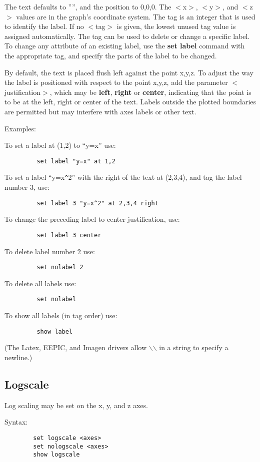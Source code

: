 The text defaults to '''', and the position to 0,0,0.  The $<$x$>$, $<$y$>$, and
$<$z$>$ values are in the graph's coordinate system.  The tag is an
integer that is used to identify the label. If no $<$tag$>$ is given, the
lowest unused tag value is assigned automatically. The tag can be used
to delete or change a specific label. To change any attribute of an
existing label, use the {\bf set label} command with the appropriate tag,
and specify the parts of the label to be changed.

By default, the text is placed flush left against the point x,y,z.
To adjust the way the label is positioned with respect to the point
x,y,z, add the parameter $<$justification$>$, which may be {\bf left}, {\bf right}
or {\bf center}, indicating that the point is to be at the left, right or
center of the text. Labels outside the plotted boundaries are
permitted but may interfere with axes labels or other text.

Examples:

To set a label at (1,2) to ``y=x'' use:
\begin{verbatim}
         set label "y=x" at 1,2
\end{verbatim}
To set a label ``y=x\verb+^+2'' with the right of the text at (2,3,4), and tag
the label number 3, use:
\begin{verbatim}
         set label 3 "y=x^2" at 2,3,4 right
\end{verbatim}
To change the preceding label to center justification, use:
\begin{verbatim}
         set label 3 center
\end{verbatim}
To delete label number 2 use:
\begin{verbatim}
         set nolabel 2
\end{verbatim}
To delete all labels use:
\begin{verbatim}
         set nolabel
\end{verbatim}
To show all labels (in tag order) use:
\begin{verbatim}
         show label
\end{verbatim}

(The Latex, EEPIC, and Imagen drivers allow $\backslash$$\backslash$ in a string to specify
a newline.)
\subsection{Logscale}
Log scaling may be set on the x, y, and z axes.

Syntax:
\begin{verbatim}
        set logscale <axes>
        set nologscale <axes>
        show logscale
\end{verbatim}

